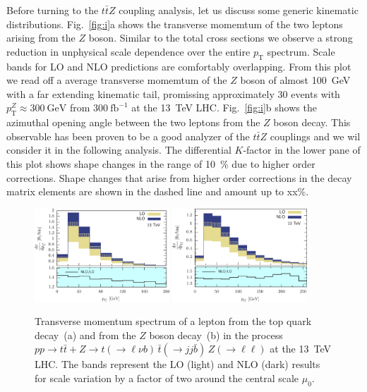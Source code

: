 \documentclass[preprint]{JHEP3} %
\newcommand{\GeV}{\mathrm{GeV}}
\newcommand{\pT}{p_{\mathrm{T}}}
\def\ttbZ{t\bar{t}Z}
\def\ttb{t\bar{t}}
\begin{document}
Before turning to the $\ttbZ$ coupling analysis, let us discuss some generic kinematic distributions.
Fig.~\ref{fig:i}a shows the transverse momemtum of the two leptons arising from the $Z$ boson.
Similar to the total cross sections we observe a strong reduction in unphysical scale dependence over the entire $\pT$ spectrum.
Scale bands for LO and NLO predictions are comfortably overlapping. 
From this plot we read off a average transverse momemtum of the $Z$ boson of almost 100~GeV with a far extending kinematic tail,
promissing approximately 30 events with $\pT^Z \approx 300~\GeV$ from $300~\mathrm{fb}^{-1}$ at the 13~TeV LHC. 
Fig.~\ref{fig:i}b shows the azimuthal opening angle between the two leptons from the $Z$ boson decay.
This observable has been proven to be a good analyzer of the $\ttbZ$ couplings \cite{Baur:2004uw} and we wil consider it in the following analysis.
The differential $K$-factor in the lower pane of this plot shows shape changes in the range of 10~\% due to higher order corrections.
Shape changes that arise from higher order corrections in the decay matrix elements are shown in the dashed line and amount up to xx\%.


\begin{figure}[t]
\centering %
\includegraphics[width=0.45\textwidth]{./LHC_53_Fig01.eps}
\hfill
\includegraphics[width=0.45\textwidth]{./LHC_53_Fig03.eps}
\caption{\label{fig:ii} Transverse momentum spectrum of a lepton from the top quark decay~(a) and from the $Z$ boson decay~(b) 
in the process $pp \to \ttb + Z \to t(\to \ell \nu b) \, \bar{t} (\to jj \bar{b}) \, Z(\to \ell \ell)$ at the 13~TeV LHC.
The bands represent the LO (light) and NLO (dark) results for scale variation by a factor of two around the central scale $\mu_0$.}
\end{figure}
\end{document}
